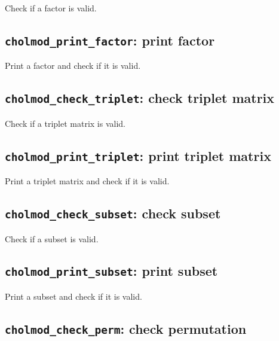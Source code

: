 \documentclass[11pt]{article}
\begin{document}

Check if a factor is valid.

\subsection{{\tt cholmod\_print\_factor}: print factor}


Print a factor and check if it is valid.

\newpage \subsection{{\tt cholmod\_check\_triplet}: check triplet matrix}


Check if a triplet matrix is valid.

\subsection{{\tt cholmod\_print\_triplet}: print triplet matrix}


Print a triplet matrix and check if it is valid.

\newpage \subsection{{\tt cholmod\_check\_subset}: check subset}


Check if a subset is valid.

\subsection{{\tt cholmod\_print\_subset}: print subset}


Print a subset and check if it is valid.

\newpage \subsection{{\tt cholmod\_check\_perm}: check permutation}
\end{document}
